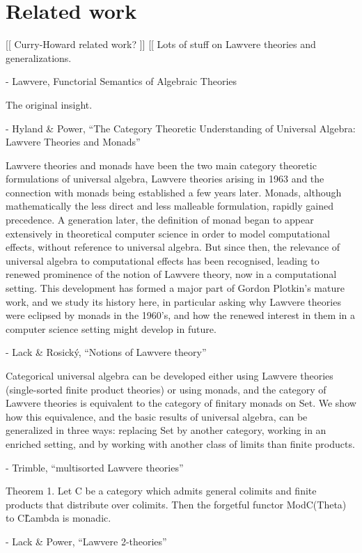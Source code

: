 \documentclass{article}
\begin{document}
\section{Related work}
[[ Curry-Howard related work? ]]
[[ Lots of stuff on Lawvere theories and generalizations.  

- Lawvere, Functorial Semantics of Algebraic Theories

The original insight.

- Hyland \& Power, ``The Category Theoretic Understanding of Universal Algebra: Lawvere Theories and Monads''

  Lawvere theories and monads have been the two main category theoretic formulations of universal algebra, Lawvere theories arising in 1963 and the connection with monads being established a few years later. Monads, although mathematically the less direct and less malleable formulation, rapidly gained precedence. A generation later, the definition of monad began to appear extensively in theoretical computer science in order to model computational effects, without reference to universal algebra. But since then, the relevance of universal algebra to computational effects has been recognised, leading to renewed prominence of the notion of Lawvere theory, now in a computational setting. This development has formed a major part of Gordon Plotkin’s mature work, and we study its history here, in particular asking why Lawvere theories were eclipsed by monads in the 1960’s, and how the renewed interest in them in a computer science setting might develop in future.

- Lack \& Rosick\'y, ``Notions of Lawvere theory''

  Categorical universal algebra can be developed either using Lawvere theories (single-sorted finite product theories) or using monads, and the category of Lawvere theories is equivalent to the category of finitary monads on Set. We show how this equivalence, and the basic results of universal algebra, can be generalized in three ways: replacing Set by another category, working in an enriched setting, and by working with another class of limits than finite products.
  
- Trimble, ``multisorted Lawvere theories''

  Theorem 1. Let C be a category which admits general colimits and finite products that distribute over colimits. Then the forgetful functor ModC(Theta) to C\^Lambda is monadic.

- Lack \& Power, ``Lawvere 2-theories''
\end{document}
